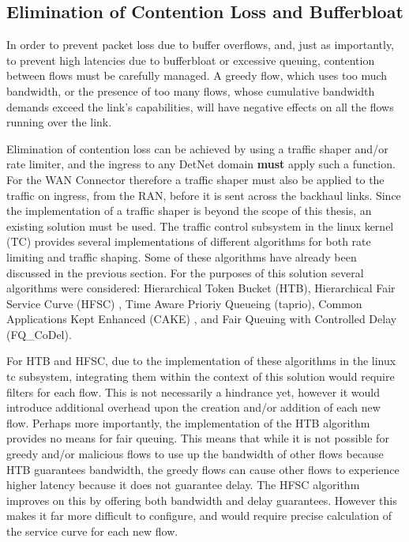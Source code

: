 \subsection{Elimination of Contention Loss and Bufferbloat}

In order to prevent packet loss due to buffer overflows, and, just as importantly, to prevent high latencies due to bufferbloat \cite{gettys2011bufferbloat} or excessive queuing, contention between flows must be carefully managed. A greedy flow, which uses too much bandwidth, or the presence of too many flows, whose cumulative bandwidth demands exceed the link's capabilities, will have negative effects on all the flows running over the link.

Elimination of contention loss can be achieved by using a traffic shaper and/or rate limiter, and the ingress to any DetNet domain \textbf{must} apply such a function. For the WAN Connector therefore a traffic shaper must also be applied to the traffic on ingress, from the RAN, before it is sent across the backhaul links. Since the implementation of a traffic shaper is beyond the scope of this thesis, an existing solution must be used. The traffic control subsystem in the linux kernel (TC) provides several implementations of different algorithms for both rate limiting and traffic shaping. Some of these algorithms have already been discussed in the previous section. For the purposes of this solution several algorithms were considered: Hierarchical Token Bucket (HTB), Hierarchical Fair Service Curve (HFSC) \cite{stoica1997hierarchical}, Time Aware Prioriy Queueing (taprio), Common Applications Kept Enhanced (CAKE) \cite{hoiland2018piece}, and Fair Queuing with Controlled Delay (FQ\_CoDel).

For HTB and HFSC, due to the implementation of these algorithms in the linux tc subsystem, integrating them within the context of this solution would require filters for each flow. This is not necessarily a hindrance yet, however it would introduce additional overhead upon the creation and/or addition of each new flow. Perhaps more importantly, the implementation of the HTB algorithm provides no means for fair queuing. This means that while it is not possible for greedy and/or malicious flows to use up the bandwidth of other flows because HTB guarantees bandwidth, the greedy flows can cause other flows to experience higher latency because it does not guarantee delay. The HFSC algorithm improves on this by offering both bandwidth and delay guarantees. However this makes it far more difficult to configure, and would require precise calculation of the service curve for each new flow.

